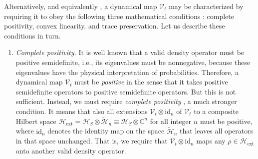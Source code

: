 \documentclass[3p,sort&compress,12pt]{elsarticle}
\newcommand{\op}[1]{#1}
\begin{document}
Alternatively, and equivalently \cite{Kraus:1983:ee}, a dynamical map $\mathcal{V}_t$ may be characterized by requiring it to obey the following three mathematical conditions \cite{Breuer:2002:oq,Alicki:2007:uu}: complete positivity, convex linearity, and trace preservation. Let us describe these conditions in turn.

\begin{enumerate} 

\item \emph{Complete positivity.} It is well known that a valid density operator must be positive semidefinite, i.e., its eigenvalues must be nonnegative, because these eigenvalues have the physical interpretation of probabilities. Therefore, a dynamical map $\mathcal{V}_t$ must be \emph{positive} in the sense that it takes positive semidefinite operators to positive semidefinite operators. But this is not sufficient. Instead, we must require \emph{complete positivity} \cite{Kraus:1971:ii,Gorini:1976:tt,Lindblad:1976:um,Breuer:2002:oq,Alicki:2001:aa,Alicki:2007:uu,Benatti:2005:ii}, a much stronger condition. It means that also all extensions $\mathcal{V}_t \otimes \text{id}_n$ of $\mathcal{V}_t$ to a composite Hilbert space $\mathcal{H}_\text{ext} = \mathcal{H}_S \otimes \tilde{\mathcal{H}}_n \equiv \mathcal{H}_S \otimes \mathbb{C}^n$ for all integer $n$ must be positive, where $\text{id}_n$ denotes the identity map on the space $\tilde{\mathcal{H}}_n$ that leaves all operators in that space unchanged. That is, we require that $\mathcal{V}_t \otimes \text{id}_n$ maps any $\op{\rho} \in \mathcal{H}_\text{ext}$ onto another valid density operator. 


\end{enumerate}
\end{document}
